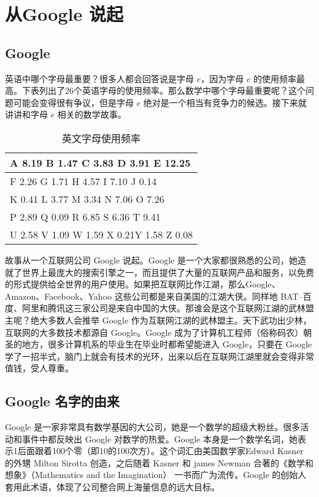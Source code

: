 
\chapter{从Google 说起}

\section{Google}
英语中哪个字母最重要？很多人都会回答说是字母 $e$，因为字母 $e$ 的使用频率最高。下表列出了26个英语字母的使用频率。那么数学中哪个字母最重要呢？这个问题可能会变得很有争议，但是字母 $e$ 绝对是一个相当有竞争力的候选。接下来就讲讲和字母 $e$ 相关的数学故事。

\begin{table}[htbp]
\centering
\begin{tabular}{|l|}
\hline
A 8.19 B 1.47 C 3.83 D 3.91 E 12.25      \\ \hline
F 2.26 G 1.71 H 4.57 I 7.10 J 0.14       \\ \hline
K 0.41 L 3.77 M 3.34 N 7.06 O 7.26       \\ \hline
P 2.89 Q 0.09 R 6.85 S 6.36 T 9.41       \\ \hline
U 2.58 V 1.09 W 1.59 X 0.21Y 1.58 Z 0.08 \\ \hline
\end{tabular}
\caption{英文字母使用频率}
\centering
\end{table}

故事从一个互联网公司 Google 说起。Google 是一个大家都很熟悉的公司，她造就了世界上最庞大的搜索引擎之一，而且提供了大量的互联网产品和服务，以免费的形式提供给全世界的用户使用。如果把互联网比作江湖，那么Google、Amazon、Facebook、Yahoo 这些公司都是来自美国的江湖大侠。同样地 BAT--百度、阿里和腾讯这三家公司是来自中国的大侠。那谁会是这个互联网江湖的武林盟主呢？绝大多数人会推举 Google 作为互联网江湖的武林盟主。天下武功出少林，互联网的大多数技术都源自 Google。Google 成为了计算机工程师（俗称码农）朝圣的地方，很多计算机系的毕业生在毕业时都希望能进入 Google，只要在 Google 学了一招半式，脑门上就会有技术的光环，出来以后在互联网江湖里就会变得非常值钱，受人尊重。

\section{Google 名字的由来}
Google 是一家非常具有数学基因的大公司，她是一个数学的超级大粉丝。很多活动和事件中都反映出 Google 对数学的热爱。Google 本身是一个数学名词，她表示1后面跟着100个零（即10的100次方）。这个词汇由美国数学家Edward Kasner 的外甥 Milton Sirotta 创造，之后随着 Kasner 和 james Newman 合著的《数学和想象》（Mathematics and the Imagination） 一书而广为流传。Google 的创始人套用此术语，体现了公司整合网上海量信息的远大目标。

